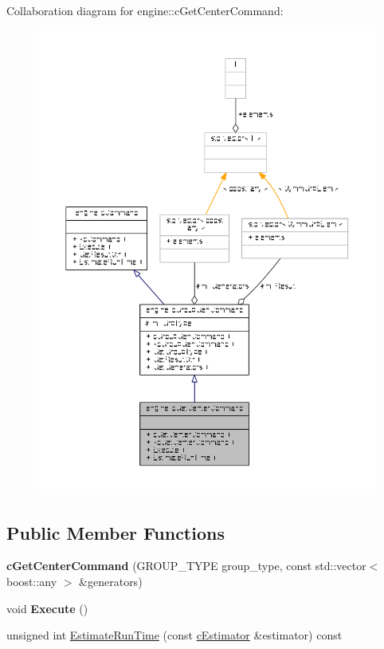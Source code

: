 Collaboration diagram for engine\-:\-:c\-Get\-Center\-Command\-:
\nopagebreak
\begin{figure}[H]
\begin{center}
\leavevmode
\includegraphics[width=350pt]{classengine_1_1cGetCenterCommand__coll__graph}
\end{center}
\end{figure}
\subsection*{Public Member Functions}
\begin{DoxyCompactItemize}
\item 
\hypertarget{classengine_1_1cGetCenterCommand_a374048afcb1188128de1d3c69392daa5}{{\bfseries c\-Get\-Center\-Command} (G\-R\-O\-U\-P\-\_\-\-T\-Y\-P\-E group\-\_\-type, const std\-::vector$<$ boost\-::any $>$ \&generators)}\label{classengine_1_1cGetCenterCommand_a374048afcb1188128de1d3c69392daa5}

\item 
\hypertarget{classengine_1_1cGetCenterCommand_a7d2754e5ade6a96e6043547a7f2b1a03}{void {\bfseries Execute} ()}\label{classengine_1_1cGetCenterCommand_a7d2754e5ade6a96e6043547a7f2b1a03}

\item 
unsigned int \hyperlink{classengine_1_1cGetCenterCommand_ab00fa221228c2550e8f664c6d887e1e0}{Estimate\-Run\-Time} (const \hyperlink{classengine_1_1cEstimator}{c\-Estimator} \&estimator) const 
\end{DoxyCompactItemize}
